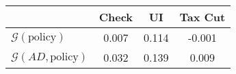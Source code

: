 \begin{tabular}{@{}lccc@{}} 
\toprule 
                          & Check      & UI    & Tax Cut    \\  \midrule 
$\mathcal{G}(\text{policy})$ & 0.007  & 0.114  & -0.001     \\ 
$\mathcal{G}(AD,\text{policy})$ & 0.032  & 0.139  & 0.009     \\ 
\end{tabular}  
